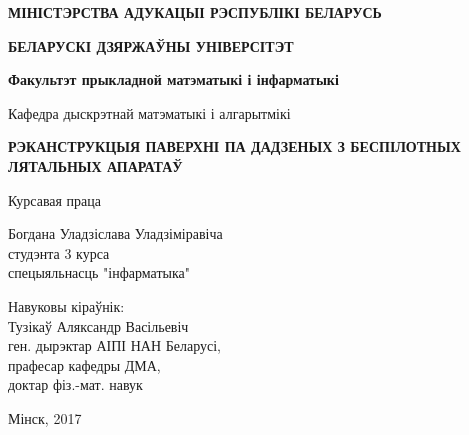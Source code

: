 \begin{titlepage}
    \begin{center}
        {\bf МІНІСТЭРСТВА АДУКАЦЫІ РЭСПУБЛІКІ БЕЛАРУСЬ}
    \end{center}
    \begin{center}
        {\bf БЕЛАРУСКІ ДЗЯРЖАЎНЫ УНІВЕРСІТЭТ}
    \end{center}
    \begin{center}
        {\bf Факультэт прыкладной матэматыкі і інфарматыкі}
    \end{center}
    \begin{center}
        Кафедра дыскрэтнай матэматыкі і алгарытмікі
    \end{center}

    \vspace{8em}

    \begin{center}
        {\bf РЭКАНСТРУКЦЫЯ ПАВЕРХНІ ПА ДАДЗЕНЫХ З БЕСПІЛОТНЫХ ЛЯТАЛЬНЫХ АПАРАТАЎ}
    \end{center}

    \vspace{2em}

    \begin{center}
        Курсавая праца
    \end{center}

    \vspace{3em}

    \begin{flushright}
        Богдана Уладзіслава Уладзіміравіча\\
        студэнта 3 курса\\
        спецыяльнасць "інфарматыка"\\
    \end{flushright}

    \vspace{1em}

    \begin{flushright}
        Навуковы кіраўнік:\\
        Тузікаў Аляксандр Васільевіч\\
        ген. дырэктар АІПІ НАН Беларусі,\\
        прафесар кафедры ДМА,\\
        доктар фіз.-мат. навук\\
    \end{flushright}

    \vfill

    \begin{center}
        Мінск, 2017
    \end{center}
\end{titlepage}
\newpage
